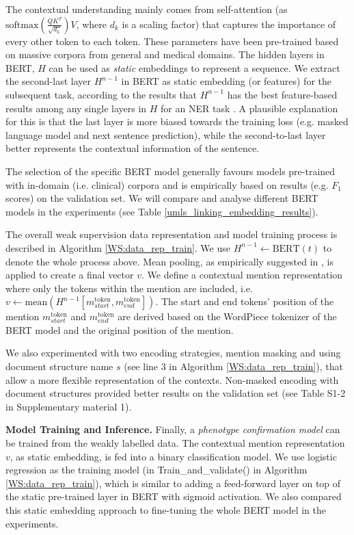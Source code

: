 \documentclass[twocolumn]{bmcart}
\begin{document}
The contextual understanding mainly comes from self-attention (as $\text{softmax}(\frac{QK^{T}}{\sqrt{d_k}})V$, where $d_k$ is a scaling factor) that captures the importance of every other token to each token. These parameters have been pre-trained based on massive corpora from general and medical domains. The hidden layers in BERT, $H$ can be used as \textit{static} embeddings to represent a sequence. We extract the second-last layer $H^{n-1}$ in BERT as static embedding (or features) for the subsequent task, according to the results that $H^{n-1}$ has the best feature-based results among any single layers in $H$ for an NER task \cite{devlin-etal-2019-bert}. A plausible explanation for this is that the last layer is more biased towards the training loss (e.g. masked language model and next sentence prediction), while the second-to-last layer better represents the contextual information of the sentence.

The selection of the specific BERT model generally favours models pre-trained with in-domain (i.e. clinical) corpora \cite{gururangan2020} and is empirically based on results (e.g. $F_1$ scores) on the validation set. We will compare and analyse different BERT models in the experiments (see Table \ref{umls_linking_embedding_results}).

The overall weak supervision data representation and model training process is described in Algorithm \ref{WS:data_rep_train}. We use $H^{n-1} \gets \text{BERT}(t)$ to denote the whole process above. Mean pooling, as empirically suggested in \cite{ma2019universal}, is applied to create a final vector $v$. We define a contextual mention representation where only the tokens within the mention are included, i.e. $v \gets \text{mean}(H^{n-1}[m^{\text{token}}_{start},m^{\text{token}}_{end}])$. The start and end tokens' position of the mention $m^{\text{token}}_{start}$ and $m^{\text{token}}_{end}$ are derived based on the WordPiece tokenizer of the BERT model and the original position of the mention.

We also experimented with two encoding strategies, mention masking and using document structure name $s$ (see line 3 in Algorithm \ref{WS:data_rep_train}), that allow a more flexible representation of the contexts. Non-masked encoding with document structures provided better results on the validation set (see Table S1-2 in Supplementary material 1).

\textbf{Model Training and Inference.} Finally, a \emph{phenotype confirmation model} can be trained from the weakly labelled data. The contextual mention representation $v$, as static embedding, is fed into a binary classification model. We use logistic regression as the training model (in Train\_and\_validate() in Algorithm \ref{WS:data_rep_train}), which is similar to adding a feed-forward layer on top of the static pre-trained layer in BERT with sigmoid activation. We also compared this static embedding approach to fine-tuning the whole BERT model in the experiments.
\end{document}
